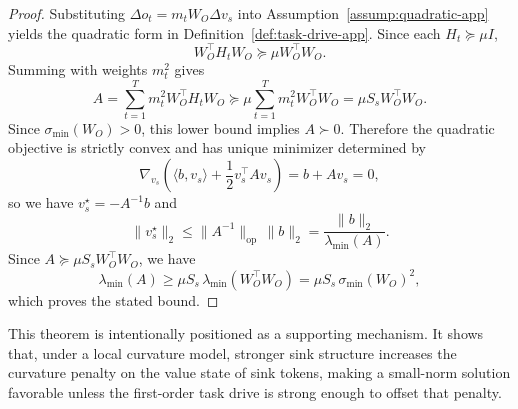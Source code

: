 \documentclass{article}
\theoremstyle{plain}
\theoremstyle{definition}
\theoremstyle{remark}
\begin{document}
\begin{proof}
Substituting $\Delta o_t = m_t W_O\Delta v_s$ into Assumption~\ref{assump:quadratic-app} yields the quadratic form in Definition~\ref{def:task-drive-app}. Since each $H_t \succeq \mu I$,
\[
    W_O^\top H_t W_O \succeq \mu W_O^\top W_O.
\]
Summing with weights $m_t^2$ gives
\[
    A = \sum_{t=1}^T m_t^2 W_O^\top H_t W_O \succeq \mu \sum_{t=1}^T m_t^2 W_O^\top W_O = \mu S_s W_O^\top W_O.
\]
Since $\sigma_{\min}(W_O)>0$, this lower bound implies $A \succ 0$. Therefore the quadratic objective is strictly convex and has unique minimizer determined by
\[
    \nabla_{v_s}\left(\langle b, v_s\rangle + \frac{1}{2}v_s^\top A v_s\right) = b + Av_s = 0,
\]
so we have $v_s^\star = -A^{-1}b$ and
\[
    \|v_s^\star\|_2 \le \|A^{-1}\|_{\mathrm{op}}\,\|b\|_2 = \frac{\|b\|_2}{\lambda_{\min}(A)}.
\]
Since $A \succeq \mu S_s W_O^\top W_O$, we have
\[
    \lambda_{\min}(A) \ge \mu S_s\,\lambda_{\min}(W_O^\top W_O) = \mu S_s\,\sigma_{\min}(W_O)^2,
\]
which proves the stated bound.
\end{proof}

This theorem is intentionally positioned as a supporting mechanism. It shows that, under a local curvature model, stronger sink structure increases the curvature penalty on the value state of sink tokens, making a small-norm solution favorable unless the first-order task drive is strong enough to offset that penalty.
\end{document}
